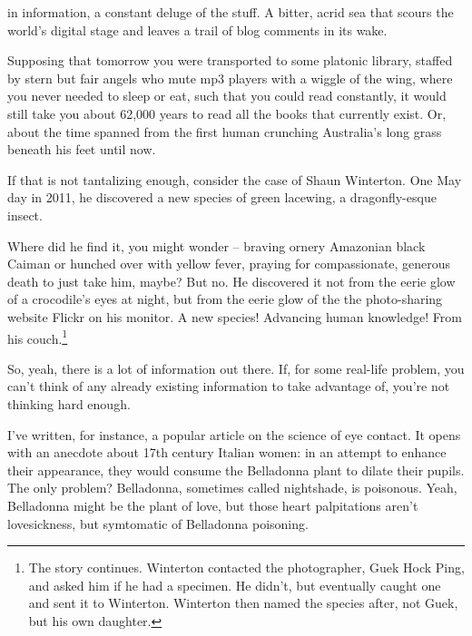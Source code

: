  in information, a constant deluge of the
stuff. A bitter, acrid sea that scours the world's digital stage and leaves a
trail of blog comments in its wake.

Supposing that tomorrow you were transported to some platonic
library, staffed
by stern but fair angels who mute mp3 players with a wiggle of the wing, where
you never needed to sleep or eat, such that you could read constantly, it would
still take you about 62,000 years to read all the books that currently
exist. Or, about the time spanned from the first human crunching Australia's
long grass
beneath his feet until
now.  

If that is not tantalizing enough, consider the case of Shaun Winterton. One May day in 2011, he discovered a new species of green lacewing, a dragonfly-esque insect.

Where did he find it, you might wonder -- braving ornery Amazonian black Caiman
or hunched over with yellow fever, praying for compassionate, generous death to just take him, maybe? But no. He discovered it not from the
eerie glow of a crocodile's eyes at night, but from the eerie glow of the the
photo-sharing website Flickr on his monitor. A new species! Advancing human
knowledge! From his couch.\cite{winterton2012charismatic}\footnote{The story
  continues. Winterton contacted the photographer, Guek Hock Ping, and asked him
  if he had a specimen. He didn't, but eventually caught one and sent it to
  Winterton. Winterton then named the species after, not Guek, but his own daughter.} 

So, yeah, there is a lot of information out there. If, for some real-life problem, you can't think of any already existing information to take advantage of, you're not thinking hard enough.

I've written, for instance, a popular article on the science of eye contact. It
opens with an anecdote about 17th century Italian women: in an attempt to
enhance their appearance, they would consume the Belladonna plant to dilate
their pupils. The only problem? Belladonna, sometimes called nightshade, is
poisonous. Yeah, Belladonna might be the plant of love, but those heart
palpitations aren't lovesickness, but symtomatic of Belladonna poisoning.

